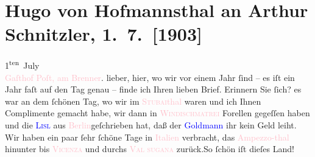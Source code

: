 

               \section[Hugo von Hofmannsthal an Arthur Schnitzler, 1. 7. {[}1903{]}]{ Hugo von Hofmannsthal an Arthur Schnitzler, 1. 7. {[}1903{]}}\nopagebreak{}\rehead{ }\normalsize\beginnumbering{} \toendnotes[C]{\smallbreak\pagebreak[2]} 
\toendnotes[C]{\smallbreak}\pstart
           \raggedleft{}{\pb}1\textsuperscript{ten} July{\\}\textcolor{pink}{Gaſthof Poſt, am Brenner}{}\ledrightnote{\textcolor{pink}{Gasthof Post}}.\pend
           \pstart
           lieber, hier, wo wir vor einem Jahr \label{K_L01301_1v}\label{K_L01301_1h} ſind – es iſt
               ein Jahr faſt auf den Tag genau – finde ich Ihren lieben Brief. Erinnern Sie ſich? es
               war an dem ſchönen Tag, wo wir im \textcolor{pink}{\textsc{Stubai}thal}{}\ledrightnote{\textcolor{pink}{Stubaital}} waren und ich Ihnen Complimente gemacht
               habe, wir dann in \textcolor{pink}{\textsc{Windischmatrei}}{}\ledrightnote{\textcolor{pink}{Matrei in Osttirol}} Forellen gegeſſen haben und die \textcolor{blue}{\textsc{Lisl}}{}\ledrightnote{\textcolor{blue}{Elisabeth Steinrück}} aus \textcolor{pink}{Berlin}{}\ledrightnote{\textcolor{pink}{Berlin}}{ }{\pb}geſchrieben hat, daß der \textcolor{blue}{Goldmann}{}\ledrightnote{\textcolor{blue}{Paul Goldmann}} ihr kein Geld leiht.\pend
           \pstart
           Wir haben ein paar ſehr ſchöne Tage in \textcolor{pink}{Italien}{}\ledrightnote{\textcolor{pink}{Italien}}
               verbracht, das \textcolor{pink}{Ampezzo-thal}{}\ledrightnote{\textcolor{pink}{Valle d’Ampezzo}} hinunter bis \textcolor{pink}{\textsc{Vicenza}}{}\ledrightnote{\textcolor{pink}{Vicenza}} und durchs \textcolor{pink}{\textsc{Val sugana}}{}\ledrightnote{\textcolor{pink}{Val Sugana}} zurück.\hspace*{1.5em}So ſchön iſt dieſes Land!\pend
